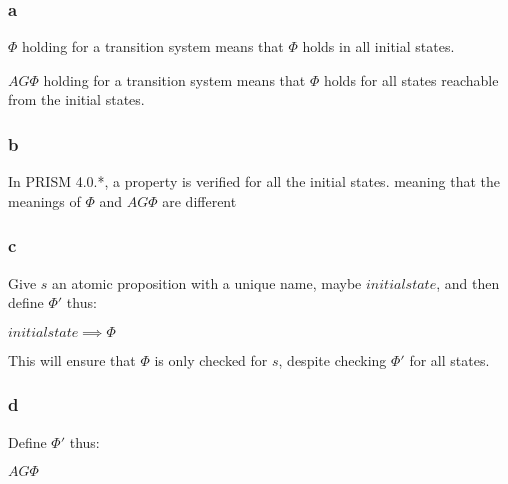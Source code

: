 \subsubsection{a}

$\Phi$ holding for a transition system means that $\Phi$ holds
in all initial states.

$AG \Phi$ holding for a transition system means that $\Phi$ holds
for all states reachable from the initial states.

\subsubsection{b}

In PRISM 4.0.*, a property is verified for all the initial states.
meaning that the meanings of $\Phi$ and $AG \Phi$ are different

\subsubsection{c}

Give $s$ an atomic proposition with a unique name,
maybe $initialstate$, and then define $\Phi '$ thus:

$initialstate \implies \Phi$

This will ensure that $\Phi$ is only checked for $s$,
despite checking $\Phi '$ for all states.

\subsubsection{d}

Define $\Phi '$ thus:

$AG \Phi$

